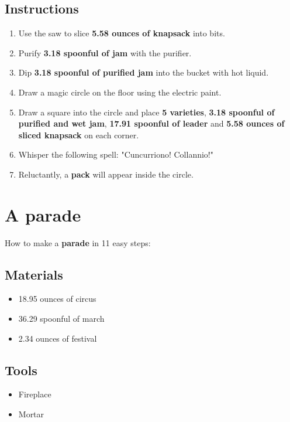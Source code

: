 \documentclass{article}
\begin{document}
\subsection{Instructions}\begin{enumerate}
\item 
Use the saw to slice \textbf{5.58 ounces of knapsack} into bits.
\item 
Purify \textbf{3.18 spoonful of jam} with the purifier.
\item 
Dip \textbf{3.18 spoonful of purified jam} into the bucket with hot liquid.
\item 
Draw a magic circle on the floor using the electric paint.
\item 
Draw a square into the circle and place \textbf{5 varieties}, \textbf{3.18 spoonful of purified and wet jam}, \textbf{17.91 spoonful of leader} and \textbf{5.58 ounces of sliced knapsack} on each corner.
\item 
Whisper the following spell: "Cuncurriono! Collannio!"
\item 
Reluctantly, a \textbf{pack} will appear inside the circle.
\end{enumerate}
\newpage
\section{A parade}How to make a \textbf{parade} in 11 easy steps:

\subsection{Materials}\begin{itemize}
\item 
18.95 ounces of circus
\item 
36.29 spoonful of march
\item 
2.34 ounces of festival
\end{itemize}
\subsection{Tools}\begin{itemize}
\item 
Fireplace
\item 
Mortar
\end{itemize}
\end{document}
